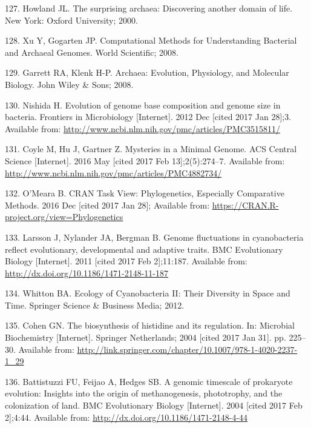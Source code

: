 \documentclass[12pt,twoside]{reedthesis}
\begin{document}
  \hypertarget{ref-howland_surprising_2000}{}
  127. Howland JL. The surprising archaea: Discovering another domain of
  life. New York: Oxford University; 2000.
  
  \hypertarget{ref-xu_computational_2008}{}
  128. Xu Y, Gogarten JP. Computational Methods for Understanding
  Bacterial and Archaeal Genomes. World Scientific; 2008.
  
  \hypertarget{ref-garrett_archaea_2008}{}
  129. Garrett RA, Klenk H-P. Archaea: Evolution, Physiology, and
  Molecular Biology. John Wiley \& Sons; 2008.
  
  \hypertarget{ref-nishida_evolution_2012}{}
  130. Nishida H. Evolution of genome base composition and genome size in
  bacteria. Frontiers in Microbiology {[}Internet{]}. 2012 Dec {[}cited
  2017 Jan 28{]};3. Available from:
  \url{http://www.ncbi.nlm.nih.gov/pmc/articles/PMC3515811/}
  
  \hypertarget{ref-coyle_mysteries_2016}{}
  131. Coyle M, Hu J, Gartner Z. Mysteries in a Minimal Genome. ACS
  Central Science {[}Internet{]}. 2016 May {[}cited 2017 Feb
  13{]};2(5):274--7. Available from:
  \url{http://www.ncbi.nlm.nih.gov/pmc/articles/PMC4882734/}
  
  \hypertarget{ref-omeara_cran_2016}{}
  132. O'Meara B. CRAN Task View: Phylogenetics, Especially Comparative
  Methods. 2016 Dec {[}cited 2017 Jan 28{]}; Available from:
  \url{https://CRAN.R-project.org/view=Phylogenetics}
  
  \hypertarget{ref-larsson_genome_2011}{}
  133. Larsson J, Nylander JA, Bergman B. Genome fluctuations in
  cyanobacteria reflect evolutionary, developmental and adaptive traits.
  BMC Evolutionary Biology {[}Internet{]}. 2011 {[}cited 2017 Feb
  2{]};11:187. Available from:
  \url{http://dx.doi.org/10.1186/1471-2148-11-187}
  
  \hypertarget{ref-whitton_ecology_2012}{}
  134. Whitton BA. Ecology of Cyanobacteria II: Their Diversity in Space
  and Time. Springer Science \& Business Media; 2012.
  
  \hypertarget{ref-cohen_biosynthesis_2004}{}
  135. Cohen GN. The biosynthesis of histidine and its regulation. In:
  Microbial Biochemistry {[}Internet{]}. Springer Netherlands; 2004
  {[}cited 2017 Jan 31{]}. pp. 225--30. Available from:
  \url{http://link.springer.com/chapter/10.1007/978-1-4020-2237-1_29}
  
  \hypertarget{ref-battistuzzi_genomic_2004}{}
  136. Battistuzzi FU, Feijao A, Hedges SB. A genomic timescale of
  prokaryote evolution: Insights into the origin of methanogenesis,
  phototrophy, and the colonization of land. BMC Evolutionary Biology
  {[}Internet{]}. 2004 {[}cited 2017 Feb 2{]};4:44. Available from:
  \url{http://dx.doi.org/10.1186/1471-2148-4-44}
  
\end{document}
